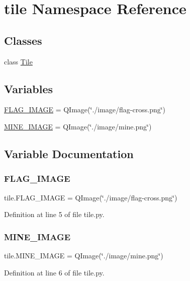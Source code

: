 \hypertarget{namespacetile}{}\section{tile Namespace Reference}
\label{namespacetile}
\subsection*{Classes}
\begin{DoxyCompactItemize}
\item 
class \mbox{\hyperlink{classtile_1_1_tile}{Tile}}
\end{DoxyCompactItemize}
\subsection*{Variables}
\begin{DoxyCompactItemize}
\item 
\mbox{\hyperlink{namespacetile_a5fde07459eab783bdc8b17786ff11b38}{F\+L\+A\+G\+\_\+\+I\+M\+A\+GE}} = Q\+Image(\char`\"{}./image/flag-\/cross.\+png\char`\"{})
\item 
\mbox{\hyperlink{namespacetile_ae1e1d59499d5404a0c7534a386d26499}{M\+I\+N\+E\+\_\+\+I\+M\+A\+GE}} = Q\+Image(\char`\"{}./image/mine.\+png\char`\"{})
\end{DoxyCompactItemize}


\subsection{Variable Documentation}
\mbox{\label{namespacetile_a5fde07459eab783bdc8b17786ff11b38}} 
\subsubsection{\texorpdfstring{FLAG\_IMAGE}{FLAG\_IMAGE}}
{\footnotesize\ttfamily tile.\+F\+L\+A\+G\+\_\+\+I\+M\+A\+GE = Q\+Image(\char`\"{}./image/flag-\/cross.\+png\char`\"{})}



Definition at line 5 of file tile.\+py.

\mbox{\label{namespacetile_ae1e1d59499d5404a0c7534a386d26499}} 
\subsubsection{\texorpdfstring{MINE\_IMAGE}{MINE\_IMAGE}}
{\footnotesize\ttfamily tile.\+M\+I\+N\+E\+\_\+\+I\+M\+A\+GE = Q\+Image(\char`\"{}./image/mine.\+png\char`\"{})}



Definition at line 6 of file tile.\+py.

